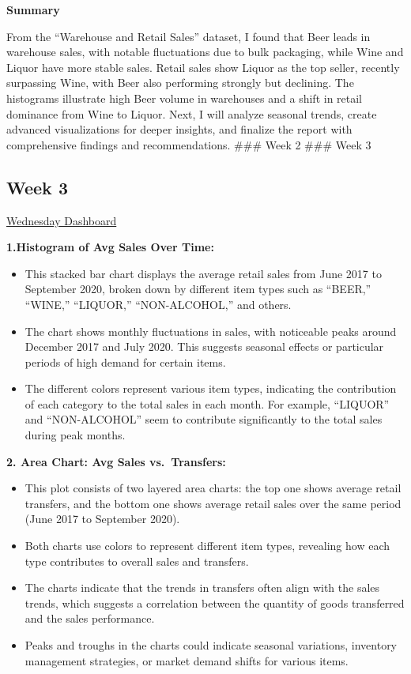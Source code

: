 \documentclass[
  letterpaper,
  DIV=11,
  numbers=noendperiod]{scrreprt}
\begin{document}
\textbf{Summary}

From the ``Warehouse and Retail Sales'' dataset, I found that Beer leads
in warehouse sales, with notable fluctuations due to bulk packaging,
while Wine and Liquor have more stable sales. Retail sales show Liquor
as the top seller, recently surpassing Wine, with Beer also performing
strongly but declining. The histograms illustrate high Beer volume in
warehouses and a shift in retail dominance from Wine to Liquor. Next, I
will analyze seasonal trends, create advanced visualizations for deeper
insights, and finalize the report with comprehensive findings and
recommendations. \#\#\# Week 2 \#\#\# Week 3

\subsection{Week 3}\label{week-3-3}

\href{https://public.tableau.com/views/Book1_17262574551960/Dashboard2?:language=en-US&publish=yes&:sid=&:redirect=auth&:display_count=n&:origin=viz_share_link}{Wednesday
Dashboard}

\textbf{1.Histogram of Avg Sales Over Time:}

\begin{itemize}
\item
  This stacked bar chart displays the average retail sales from June
  2017 to September 2020, broken down by different item types such as
  ``BEER,'' ``WINE,'' ``LIQUOR,'' ``NON-ALCOHOL,'' and others.
\item
  The chart shows monthly fluctuations in sales, with noticeable peaks
  around December 2017 and July 2020. This suggests seasonal effects or
  particular periods of high demand for certain items.
\item
  The different colors represent various item types, indicating the
  contribution of each category to the total sales in each month. For
  example, ``LIQUOR'' and ``NON-ALCOHOL'' seem to contribute
  significantly to the total sales during peak months.
\end{itemize}

\textbf{2. Area Chart: Avg Sales vs.~Transfers:}

\begin{itemize}
\item
  This plot consists of two layered area charts: the top one shows
  average retail transfers, and the bottom one shows average retail
  sales over the same period (June 2017 to September 2020).
\item
  Both charts use colors to represent different item types, revealing
  how each type contributes to overall sales and transfers.
\item
  The charts indicate that the trends in transfers often align with the
  sales trends, which suggests a correlation between the quantity of
  goods transferred and the sales performance.
\item
  Peaks and troughs in the charts could indicate seasonal variations,
  inventory management strategies, or market demand shifts for various
  items.
\end{itemize}
\end{document}

